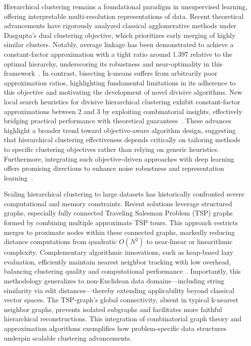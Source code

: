 \documentclass[sigconf]{acmart}
\begin{document}
Hierarchical clustering remains a foundational paradigm in unsupervised learning, offering interpretable multi-resolution representations of data. Recent theoretical advancements have rigorously analyzed classical agglomerative methods under Dasgupta’s dual clustering objective, which prioritizes early merging of highly similar clusters. Notably, average linkage has been demonstrated to achieve a constant-factor approximation with a tight ratio around 1.397 relative to the optimal hierarchy, underscoring its robustness and near-optimality in this framework~\cite{ref12}. In contrast, bisecting k-means suffers from arbitrarily poor approximation ratios, highlighting fundamental limitations in its adherence to this objective and motivating the development of novel divisive algorithms. New local search heuristics for divisive hierarchical clustering exhibit constant-factor approximations between 2 and 3 by exploiting combinatorial insights, effectively bridging practical performance with theoretical guarantees~\cite{ref12}. These advances highlight a broader trend toward objective-aware algorithm design, suggesting that hierarchical clustering effectiveness depends critically on tailoring methods to specific clustering objectives rather than relying on generic heuristics. Furthermore, integrating such objective-driven approaches with deep learning offers promising directions to enhance noise robustness and representation learning~\cite{ref12}.

Scaling hierarchical clustering to large datasets has historically confronted severe computational and memory constraints. Recent solutions leverage structured graphs, especially fully connected Traveling Salesman Problem (TSP) graphs formed by combining multiple approximate TSP tours. This approach restricts merges to proximate nodes within these connected graphs, markedly reducing distance computations from quadratic \(O(N^2)\) to near-linear or linearithmic complexity. Complementary algorithmic innovations, such as heap-based lazy evaluation, efficiently maintain nearest neighbor tracking with low overhead, balancing clustering quality and computational performance~\cite{ref21}. Importantly, this methodology generalizes to non-Euclidean data domains—including string similarity via edit distances—thereby extending applicability beyond classical vector spaces. The TSP-graph’s global connectivity, absent in typical k-nearest neighbor graphs, prevents isolated subgraphs and facilitates more faithful hierarchical reconstructions. This integration of combinatorial graph theory and approximation algorithms exemplifies how problem-specific data structures underpin scalable clustering advancements.
\end{document}
